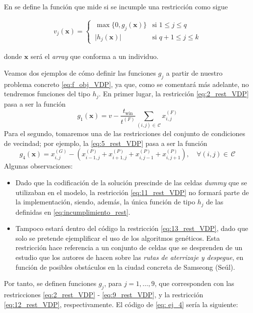 \documentclass[12pt,a4paper]{book}
\begin{document}
En \cite{yu_introduction_2010} se define la función que mide si se incumple una restricción como sigue 

\begin{align}
v_j(\mathbf{x}) = \begin{cases}
    ~\max\{0, g_j(\mathbf{x})\} & \text{si } 1 \leq j \leq q \\
    ~\vert h_j(\mathbf{x}) \vert & \text{si } q + 1 \leq j \leq k
\end{cases} \label{eq:incumplimiento_rest}
\end{align}

donde $\mathbf{x}$ será el \textsl{array} que conforma a un individuo. 

Veamos dos ejemplos de cómo definir las funciones $g_j$ a partir de nuestro problema concreto \ref{eq:f_obj_VDP}, ya que, como se comentará más adelante, no tendremos funciones del tipo $h_j$. En primer lugar, la restricción \ref{eq:2_rest_VDP} pasa a ser la función
\begin{equation}
g_1(\mathbf{x}) = v - \dfrac{t_{\text{win}}}{t^{(F)}} \sum_{(i,j) \in \, \mathcal{C}} x_{i,j}^{(F)}
\end{equation}
Para el segundo, tomaremos una de las restricciones del conjunto de condiciones de vecindad; por ejemplo, la \ref{eq:5_rest_VDP} pasa a ser la función
\begin{equation}
g_4(\mathbf{x}) = x_{i,j}^{(G)} - (x_{i-1,j}^{(P)}+x_{i+1,j}^{(P)}+x_{i,j-1}^{(P)}+x_{i,j+1}^{(P)}) , \quad \forall (i,j) \in \, \mathcal{C} \label{eq: ej_4}
\end{equation}
Algunas observaciones:
\begin{itemize}
	\item Dado que la codificación de la solución prescinde de las celdas \textsl{dummy} que se utilizaban en el modelo, la restricción \ref{eq:11_rest_VDP} no formará parte de la implementación, siendo, además, la única función de tipo $h_j$ de las definidas en \ref{eq:incumplimiento_rest}.
	\item Tampoco estará dentro del código la restricción \ref{eq:13_rest_VDP}, dado que solo se pretende ejemplificar el uso de los algoritmos genéticos. Esta restricción hace referencia a un conjunto de celdas que se desprenden de un estudio que los autores de \cite{park_vertiport_2022} hacen sobre las {\sl rutas de aterrizaje y despegue}, en función de posibles obstáculos en la ciudad concreta de Samseong (Seúl).
\end{itemize}

Por tanto, se definen funciones $g_j$, para $j=1,\ldots,9$, que corresponden con las restricciones \ref{eq:2_rest_VDP} - \ref{eq:9_rest_VDP}, y la restricción \ref{eq:12_rest_VDP}, respectivamente. El código de \ref{eq: ej_4} sería la siguiente: 
\end{document}
